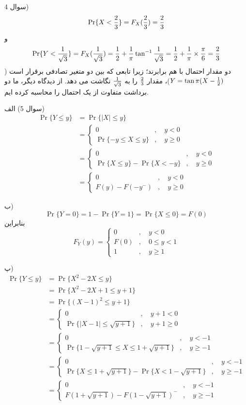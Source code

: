 \documentclass[10pt,letterpaper]{report}
\begin{document}
سوال 4) 
$$
\Pr\{X<{2\over 3}\}=F_X({2\over 3})={2\over 3}
$$
و
$$
\Pr\{Y<{1\over \sqrt3}\}=F_X({1\over \sqrt3})={1\over 2}+{1\over\pi}\tan^{-1}{1\over\sqrt 3}={1\over 2}+{1\over\pi}\times{\pi\over 6}={2\over 3}
$$
دو مقدار احتمال با هم برابرند؛ زیرا تابعی که بین دو متغیر تصادفی برقرار است ($Y=\tan\pi(X-{1\over 2})$)، مقدار 
$
2\over 3
$
را به 
$
{1\over \sqrt 3}
$
نگاشت می دهد. از دیدگاه دیگر، ما دو برداشت متفاوت از یک احتمال را محاسبه کرده ایم.

سوال 5) الف) 
\[
\begin{split}
\Pr\{Y\le y\}&=\Pr\{|X|\le y\}
\\&=\begin{cases}
0&,\quad y<0\\
\Pr\{-y\le X\le y\}&,\quad y\ge 0
\end{cases}
\\&=\begin{cases}
0&,\quad y<0\\
\Pr\{X\le y\}-\Pr\{X<-y\}&,\quad y\ge 0
\end{cases}
\\&=\begin{cases}
0&,\quad y<0\\
F(y)-F(-y^-)&,\quad y\ge 0
\end{cases}
\end{split}
\]

ب) 
$$
\Pr\{Y=0\}=1-\Pr\{Y=1\}=\Pr\{X\le0\}=F(0)
$$
بنابراین
$$
F_Y(y)=\begin{cases}
0&,\quad y<0\\
F(0)&,\quad 0\le y<1\\
1&,\quad y\ge 1
\end{cases}
$$

پ) 
\[
\begin{split}
\Pr\{Y\le y\}&=\Pr\{X^2-2X\le y\}
\\&=\Pr\{X^2-2X+1\le y+1\}
\\&=\Pr\{(X-1)^2\le y+1\}
\\&=\begin{cases}
0&,\quad y+1<0\\
\Pr\{|X-1|\le \sqrt{y+1}\}&,\quad y+1\ge 0
\end{cases}
\\&=\begin{cases}
0&,\quad y<-1\\
\Pr\{1-\sqrt{y+1}\le X\le 1+\sqrt{y+1}\}&,\quad y\ge -1
\end{cases}
\\&=\begin{cases}
0&,\quad y<-1\\
\Pr\{X\le 1+\sqrt{y+1}\}-\Pr\{X< 1-\sqrt{y+1}\}&,\quad y\ge -1
\end{cases}
\\&=\begin{cases}
0&,\quad y<-1\\
F(1+\sqrt{y+1})-F(1-\sqrt{y+1})^-&,\quad y\ge -1
\end{cases}
\end{split}
\]
\end{document}
